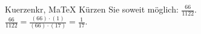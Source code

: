 \begin{MAufgabe}{Kuerzen}{kr, MaTeX}
K\"urzen Sie soweit m\"oglich: $\frac{66}{1122}$.\\ 
\ifLsg\MLoesung
\quad $\frac{66}{1122}=\frac{(66)\cdot(1)}{(66)\cdot(17)}=\frac{1}{17}$.\else\relax\fi
 \end{MAufgabe}